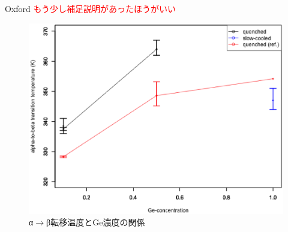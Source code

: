 Oxford \textcolor{red}{もう少し補足説明があったほうがいい}

\begin{figure}[!h]
    \begin{center}
   \includegraphics[width=0.6\hsize]{samples/TransitionT.eps}
  \end{center}
  \caption{α$\to$β転移温度とGe濃度の関係}
  \label{fig:dTransitionT}
\end{figure}


